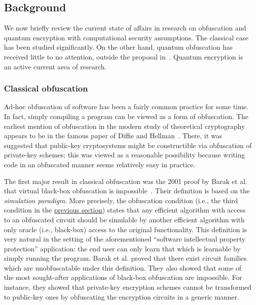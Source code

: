 \documentclass[11pt]{article}
\numberwithin{equation}{section}
\newcommand{\expreft}[2]{\texorpdfstring{\hyperref[#2]{#1}}{#1}}
\begin{document}
{\subsection{Background}

We now briefly review the current state of affairs in research on obfuscation and quantum encryption with computational security assumptions. The classical case has been studied significantly. On the other hand, quantum obfuscation has received little to no attention, outside the proposal in~\cite{AJJ14}. Quantum encryption is an active current area of research.

\subsubsection{Classical obfuscation} 

Ad-hoc obfuscation of software has been a fairly common practice for some time. In fact, simply compiling a program can be viewed as a form of obfuscation.  The earliest mention of obfuscation in the modern study of theoretical cryptography appears to be in the famous paper of Diffie and Hellman~\cite{DH76}. There, it was suggested that public-key cryptosystems might be constructible via obfuscation of private-key schemes; this was viewed as a reasonable possibility because writing code in an obfuscated manner seems relatively easy in practice. 

The first major result in classical obfuscation was the 2001 proof by Barak et al. that virtual black-box obfuscation is impossible~\cite{BGIRSVY01, BGIRSVY12}. Their definition is based on the \emph{simulation paradigm}. More precisely, the obfuscation condition (i.e., the third condition in the \expreft{previous section}{def:obf-informal}) states that any efficient algorithm with access to an obfuscated circuit should be simulable by another efficient algorithm with only oracle (i.e., black-box) access to the original functionality. This definition is very natural in the setting of the aforementioned ``software intellectual property protection'' application: the end user can only learn that which is learnable by simply running the program. Barak et al. proved that  there exist circuit families which are unobfuscatable under this definition. They also showed that some of the most sought-after applications of black-box obfuscation are impossible. For instance, they showed that private-key encryption schemes cannot be transformed to public-key ones by obfuscating the encryption circuits in a generic manner.

}
\end{document}
